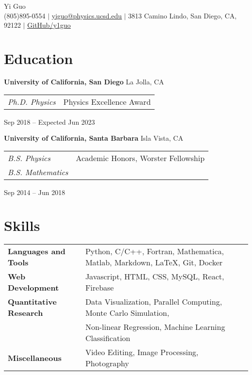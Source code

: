 \documentclass[letterpaper,12pt]{article}
\begin{document}
\newcommand{\name}{Yi Guo}
\newcommand{\phone}{(805)895-0554}
\newcommand{\email}{yiguo@physics.ucsd.edu}
\newcommand{\address}{3813 Camino Lindo, San Diego, CA, 92122}
\newcommand{\github}{y1guo}
\newcommand{\linkedin}{y1guo}
\newcommand{\website}{https://y1guo.github.io}

\begin{center}
    \Huge \name \\
    \vspace{1pt}
    \small \phone 
    $|$ \href{mailto:\email}{\underline{\email}} 
    $|$ \address
    $|$ \href{https://github.com/\github}{\underline{GitHub/\github}} 
    \vspace{-15pt}
\end{center}


\section{Education}

\textbf{University of California, San Diego} \hfill La Jolla, CA \\
\begin{tabular}{p{10em} p{20em}}
    \textit{Ph.D. Physics} 
    & Physics Excellence Award 
\end{tabular}
\hfill Sep 2018 -- Expected Jun 2023

\textbf{University of California, Santa Barbara} \hfill Isla Vista, CA \\
\begin{tabular}{p{10em} p{20em}}
    \textit{B.S. Physics}
    & Academic Honors, Worster Fellowship \\
    \textit{B.S. Mathematics}
    &
\end{tabular}
\hfill Sep 2014 -- Jun 2018


\section{Skills}

\begin{tabular}{p{10em} p{33em}}
    \textbf{Languages and Tools} 
    & Python, C/C++, Fortran, Mathematica, Matlab, Markdown, \LaTeX, Git, Docker \\
    \textbf{Web Development}
    & Javascript, HTML, CSS, MySQL, React, Firebase \\
    \textbf{Quantitative Research} 
    & Data Visualization, Parallel Computing, Monte Carlo Simulation, \\
    & Non-linear Regression, Machine Learning Classification \\
    \textbf{Miscellaneous} 
    & Video Editing, Image Processing, Photography
\end{tabular}
\end{document}
